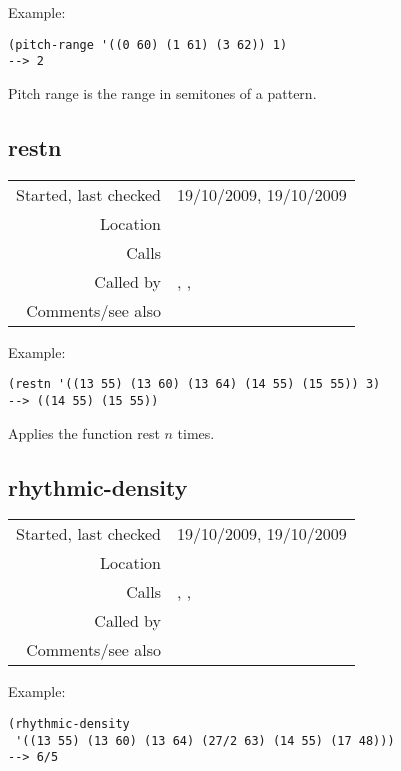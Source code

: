 \vspace{0.5cm}
\noindent Example:
\begin{verbatim}
(pitch-range '((0 60) (1 61) (3 62)) 1)
--> 2

\end{verbatim}

\noindent Pitch range is the range in semitones of a
pattern.


\subsection*{restn}\label{fun:restn}

\vspace{0.3cm}
\begin{tabular}{r|p{8cm}}
Started, last checked & 19/10/2009, 19/10/2009 \\
Location & \nameref{sec:musical-properties} \\
Calls & \\
Called by & \nameref{fun:rhythmic-density}, \nameref{fun:top-line}, \nameref{fun:top-line-verbose} \\
Comments/see also &
\end{tabular}

\vspace{0.5cm}
\noindent Example:
\begin{verbatim}
(restn '((13 55) (13 60) (13 64) (14 55) (15 55)) 3)
--> ((14 55) (15 55))
\end{verbatim}

\noindent Applies the function rest $n$ times.


\subsection*{rhythmic-density}\label{fun:rhythmic-density}

\vspace{0.3cm}
\begin{tabular}{r|p{8cm}}
Started, last checked & 19/10/2009, 19/10/2009 \\
Location & \nameref{sec:musical-properties} \\
Calls & \nameref{fun:density}, \nameref{fun:my-last}, \nameref{fun:restn} \\
Called by & \\
Comments/see also &
\end{tabular}

\vspace{0.5cm}
\noindent Example:
\begin{verbatim}
(rhythmic-density
 '((13 55) (13 60) (13 64) (27/2 63) (14 55) (17 48)))
--> 6/5
\end{verbatim}

